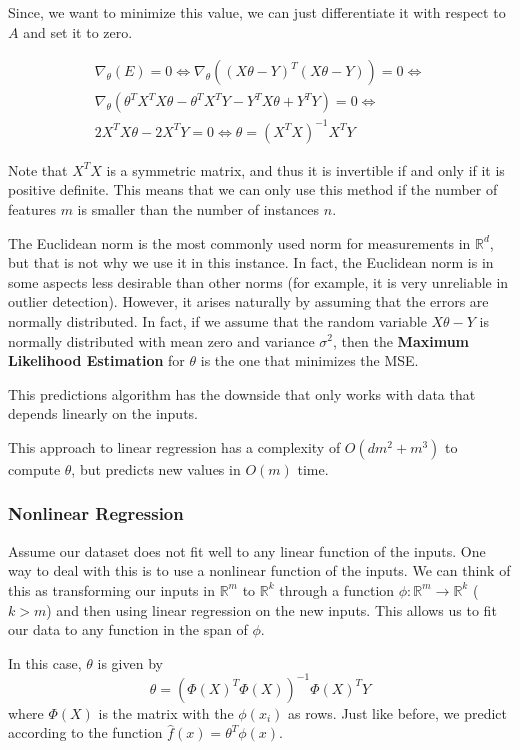 \documentclass{article}
\newcommand{\R}{\mathbb{R}}
\begin{document}
Since, we want to minimize this value, we can just differentiate it with respect to $A$ and set it to zero.

\begin{gather*}
\nabla_\theta (E) = 0 \Leftrightarrow 
\nabla_\theta  \left( (X \theta - Y)^T(X \theta - Y) \right) = 0 \Leftrightarrow \\
\nabla_\theta  \left( \theta^T X^T X \theta - \theta^T X^T Y - Y^T X \theta + Y^T Y \right) = 0 \Leftrightarrow \\
2 X^T X \theta - 2 X^T Y = 0 \Leftrightarrow 
\theta = (X^T X)^{-1} X^T Y
\end{gather*}

Note that $X^T X$ is a symmetric matrix, and thus it is invertible if and only if it is positive definite.
This means that we can only use this method if the number of features $m$ is smaller than the number of instances $n$.

The Euclidean norm is the most commonly used norm for measurements in $\R^d$, but that is not why we use it in this instance.
In fact, the Euclidean norm is in some aspects less desirable than other norms (for example, it is very unreliable in outlier detection).
However, it arises naturally by assuming that the errors are normally distributed.
In fact, if we assume that the random variable $X \theta - Y$ is normally distributed with mean zero and variance $\sigma^2$, then the \textbf{Maximum Likelihood Estimation} for $\theta$ is the one that minimizes the MSE.

This predictions algorithm has the downside that only works with data that depends linearly on the inputs.

This approach to linear regression has a complexity of $O(dm^2 + m^3)$ to compute $\theta$, but predicts new values in $O(m)$ time.

\subsubsection{Nonlinear Regression}

Assume our dataset does not fit well to any linear function of the inputs. 
One way to deal with this is to use a nonlinear function of the inputs.
We can think of this as transforming our inputs in $\R^m$ to $\R^k$ through a function $\phi: \R^m \to \R^k$ ($k > m$) and then using linear regression on the new inputs.
This allows us to fit our data to any function in the span of $\phi$.

In this case, $\theta$ is given by
$$
\theta = (\Phi(X)^T \Phi(X))^{-1} \Phi(X)^T Y
$$
where $\Phi(X)$ is the matrix with the $\phi(x_i)$ as rows.
Just like before, we predict according to the function $\hat{f}(x) = \theta^T \phi(x)$.
\end{document}
